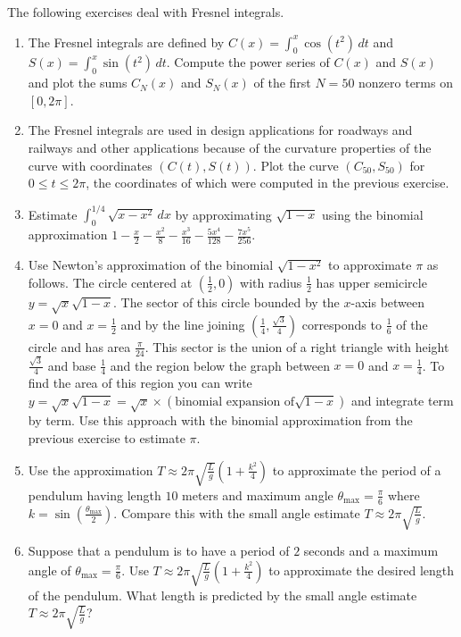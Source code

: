 \documentclass{exercises}
\begin{document}
The following exercises deal with Fresnel integrals.

\begin{enumerate}[resume]
\item The Fresnel integrals are defined by $C(x)=\int_{0}^{x}\cos(t^{2})\,dt$ and $S(x)=\int_{0}^{x}\sin(t^{2})\,dt$. Compute the power series of $C(x)$ and $S(x)$ and plot the sums $C_{N}(x)$ and $S_{N}(x)$ of the first $N=50$ nonzero terms on $[0,2\pi]$.
\item \techrequired The Fresnel integrals are used in design applications for roadways and railways and other applications because of the curvature properties of the curve with coordinates $(C(t),S(t))$. Plot the curve $(C_{50},S_{50})$ for $0\le t\le2\pi$, the coordinates of which were computed in the previous exercise.
\item Estimate $\int_{0}^{1/4}\sqrt{x-x^{2}}\,dx$ by approximating $\sqrt{1-x}$ using the binomial approximation $1-\frac{x}{2}-\frac{x^{2}}{8}-\frac{x^{3}}{16}-\frac{5x^{4}}{128}-\frac{7x^{5}}{256}$.
\item \techrequired Use Newton's approximation of the binomial $\sqrt{1-x^{2}}$ to approximate $\pi$ as follows. The circle centered at $(\frac{1}{2},0)$ with radius $\frac{1}{2}$ has upper semicircle $y=\sqrt{x}\sqrt{1-x}$. The sector of this circle bounded by the $x$-axis between $x=0$ and $x=\frac{1}{2}$ and by the line joining $(\frac{1}{4},\frac{\sqrt{3}}{4})$ corresponds to $\frac{1}{6}$ of the circle and has area $\frac{\pi}{24}$. This sector is the union of a right triangle with height $\frac{\sqrt{3}}{4}$ and base $\frac{1}{4}$ and the region below the graph between $x=0$ and $x=\frac{1}{4}$. To find the area of this region you can write $y=\sqrt{x}\sqrt{1-x}=\sqrt{x}\times (\text{binomial expansion of}\sqrt{1-x})$ and integrate term by term. Use this approach with the binomial approximation from the previous exercise to estimate $\pi$.
\item Use the approximation $T\approx2\pi \sqrt{\frac{L}{g}}(1+\frac{k^{2}}{4})$ to approximate the period of a pendulum having length $10$ meters and maximum angle $\theta_{\text{max}}=\frac{\pi}{6}$ where $k=\sin(\frac{\theta_{\text{max}}}{2})$. Compare this with the small angle estimate $T\approx2\pi \sqrt{\frac{L}{g}}$.
\item Suppose that a pendulum is to have a period of $2$ seconds and a maximum angle of $\theta_{\text{max}}=\frac{\pi}{6}$. Use $T\approx2\pi \sqrt{\frac{L}{g}}(1+\frac{k^{2}}{4})$ to approximate the desired length of the pendulum. What length is predicted by the small angle estimate $T\approx2\pi \sqrt{\frac{L}{g}}$?

\end{enumerate}
\end{document}
